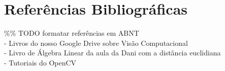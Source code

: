 \documentclass[a4paper]{article}
\begin{document}
\section{ Referências Bibliográficas}


\%\% TODO formatar referências em ABNT \\
- Livros do nosso Google Drive sobre Visão Computacional \\
- Livro de Álgebra Linear da aula da Dani com a distância euclidiana \\
- Tutoriais do OpenCV \\


\break
\end{document}
